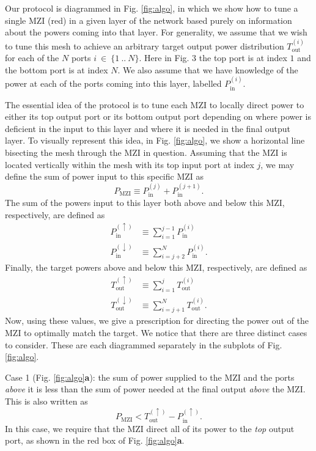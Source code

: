 Our protocol is diagrammed in Fig. \ref{fig:algo}, in which we show how to tune a single MZI (red) in a given layer of the network based purely on information about the powers coming into that layer.  For generality, we assume that we wish to tune this mesh to achieve an arbitrary target output power distribution $T_\textrm{out}^{(i)}$ for each of the $N$ ports $i~\in~\{1~..~N\}$.  Here in Fig. 3 the top port is at index $1$ and the bottom port is at index $N$.  We also assume that we have knowledge of the power at each of the ports coming into this layer, labelled $P_\textrm{in}^{(i)}$.

The essential idea of the protocol is to tune each MZI to locally direct power to either its top output port or its bottom output port depending on where power is deficient in the input to this layer and where it is needed in the final output layer. To visually represent this idea, in Fig. \ref{fig:algo}, we show a horizontal line bisecting the mesh through the MZI in question.  Assuming that the MZI is located vertically within the mesh with its top input  port at index $j$, we may define the sum of power input to this specific MZI as
%
\begin{equation}
    P_\textrm{MZI} \equiv P_\textrm{in}^{(j)} + P_\textrm{in}^{(j+1)}.
\end{equation}
%
The sum of the powers input to this layer both above and below this MZI, respectively, are defined as
%
\begin{align}
    P_\textrm{in}^{(\uparrow)} &\equiv \sum_{i=1}^{j-1} P_\textrm{in}^{(i)}\\
    P_\textrm{in}^{(\downarrow)} &\equiv \sum_{i=j+2}^N P_\textrm{in}^{(i)}.
\end{align}
%
Finally, the target powers above and below this MZI, respectively, are defined as
%
\begin{align}
    T_\textrm{out}^{(\uparrow)} &\equiv \sum_{i=1}^j T_\textrm{out}^{(i)} \\
    T_\textrm{out}^{(\downarrow)} &\equiv \sum_{i=j+1}^N T_\textrm{out}^{(i)}.
\end{align}
%
Now, using these values, we give a prescription for directing the power out of the MZI to optimally match the target.  We notice that there are three distinct cases to consider.  These are each diagrammed separately in the subplots of Fig. \ref{fig:algo}.  

Case 1 (Fig. \ref{fig:algo}\textbf{a}):  the sum of power supplied to the MZI and the ports \textit{above} it is less than the sum of power needed at the final output \textit{above} the MZI.  This is also written as
\begin{equation}
    P_\textrm{MZI} < T_\textrm{out}^{(\uparrow)} -  P_\textrm{in}^{(\uparrow)}.
\end{equation}
In this case, we require that the MZI direct all of its power to the \textit{top} output port, as shown in the red box of Fig. \ref{fig:algo}\textbf{a}.

